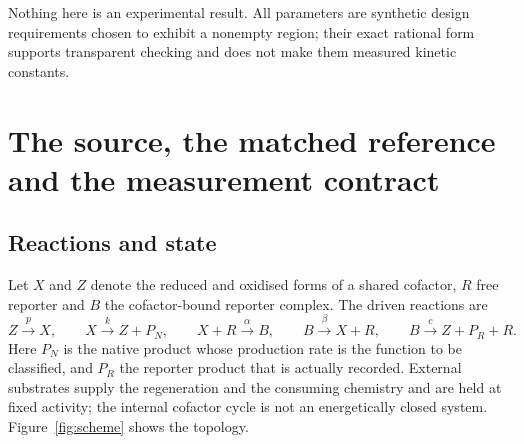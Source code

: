 \documentclass[11pt]{article}
\theoremstyle{definition}
\theoremstyle{remark}
\begin{document}
Nothing here is an experimental result. All parameters are synthetic design
requirements chosen to exhibit a nonempty region; their exact rational form
supports transparent checking and does not make them measured kinetic constants.

\section{The source, the matched reference and the measurement contract}
\label{sec:source}

\subsection{Reactions and state}

Let $X$ and $Z$ denote the reduced and oxidised forms of a shared cofactor, $R$
free reporter and $B$ the cofactor-bound reporter complex. The driven reactions
are
\begin{equation}
Z\xrightarrow{\;p\;}X,\qquad
X\xrightarrow{\;k\;}Z+P_N,\qquad
X+R\xrightarrow{\;\alpha\;}B,\qquad
B\xrightarrow{\;\beta\;}X+R,\qquad
B\xrightarrow{\;c\;}Z+P_R+R.
\label{eq:reactions}
\end{equation}
Here $P_N$ is the native product whose production rate is the function to be
classified, and $P_R$ the reporter product that is actually recorded. External
substrates supply the regeneration and the consuming chemistry and are held at
fixed activity; the internal cofactor cycle is not an energetically closed
system. Figure~\ref{fig:scheme} shows the topology.
\end{document}
